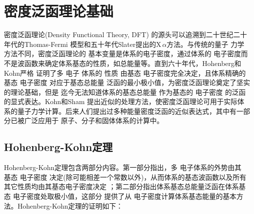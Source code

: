 \chapter{密度泛函{理论}基础} \label{chap:dft}

密度泛函理论(Density Functional Theory, DFT)\cite{Parr-Yang,CR91-651_1991}%
{的源头}可以追溯到二十世纪二十年代的Thomas-Fermi%
{模型}\cite{PCPS23-542_1927,ZP48-73_1928}和五十年代Slater提出的X\,$\alpha$方法\cite{PR81-385_1951}。与传统的量子%
{力}学方法不同，密度泛函理论的%
{基本变量是体系的电子}密度，通过体系的%
{电}子密度而不是波函数来确定体系基态的性质，如总能量等。直到六十年代，Hohenberg和Kohn\cite{PRB136-864_1964}严格%
证明了多%
{电}子%
体系的%
性质%
由基态%
{电}子密度完全决定，且体系精确的基态%
{电}子密度%
{对应于}基态总能量%
{泛函的最小极小值}，为密度泛函理论奠定了坚实的理论基础，但是%
{迄今无法知道}体系的基态总能量%
{作为}基态的%
{电}子密度%
{的泛函的显式表达}。Kohn和\linebreak Sham\cite{PRA140-1133_1965}%
{提出近似的处理方法，使密度泛函理论可用于实际体系的量子力学计算。后来人们提出过多种能量密度泛函的近似表达式，其中有一部分已被}广泛应用于%
原子、分子和固体体系{的计算中\cite{CJP58-1200_1980,PRB45-13244_1992,PRA38-3098_1988,PRB33-8822_1986,PRB37-785_1988}}。

\section{Hohenberg-Kohn定理}
Hohenberg-Kohn定理\cite{PRB136-864_1964}包含两部分{内容}。第一部分指出，多%
{电}子体系的外势由其%
基态%
{电}子密度%
决定(除可能相差一个常数以外)，从而体系的基态波函数以及所有其它性质均由其基态电子密度决定
；第二部分指出体系基态总能量{泛函}在体系基态%
{电}子密度处取极小{值}，这部分%
{提供}了从%
{电}子密度计算体系基态能量的基本方法。Hohenberg-Kohn定理的证明如下：

